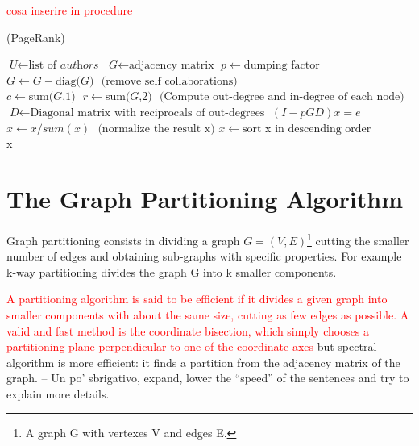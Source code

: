 \documentclass[]{usiinfbachelorproject}
\begin{document}
\textcolor{red}{cosa inserire in procedure}
\begin{algorithm}
\caption{ (PageRank)}\label{pagerank}
\begin{algorithmic}[1]
\State $\textit{U} \gets \text{list of }\textit{authors}$
\State $\textit{G} \gets \text{adjacency matrix}$
\State $p \gets \text{dumping factor}$
\State $\textit{G} \gets \textit{G} - \text{diag(}\textit{G}\text{)} \: \: \: \text{(remove self collaborations)}$
\State $\textit{c} \gets \text{sum(}\textit{G}\text{,1)} \:\:\: \textit{r} \gets \text{sum(}\textit{G}\text{,2)} \:\:\: \text{(Compute out-degree and in-degree of each node)}$
\State $\textit{D} \gets \text{Diagonal matrix with reciprocals of out-degrees}$
\State $(I - pGD)x = e$
\State $x \gets x / sum(x) \: \:\: \text{(normalize the result x)}$
\State $x \gets \text{sort x in descending order}$\\
\Return x
\EndProcedure
\end{algorithmic}
\end{algorithm}






\section{The Graph Partitioning Algorithm} \label{sec:graphpart} 
Graph partitioning consists in dividing a graph $G=(V,E)$\footnote{A graph G with vertexes V and edges E.}  cutting the smaller number of edges and obtaining sub-graphs with specific properties. For example k-way partitioning divides the graph G into k smaller components.

\textcolor{red}{A partitioning algorithm is said to be efficient if it divides a given graph into smaller components with about the same size, cutting as few edges as possible. 
A valid and fast method is the coordinate bisection, which simply chooses a partitioning plane perpendicular to one of the coordinate axes} but spectral algorithm is more efficient: it finds a partition from the adjacency matrix of the graph. -- Un po' sbrigativo, expand, lower the ``speed'' of the sentences and try to explain more details.
\end{document}
